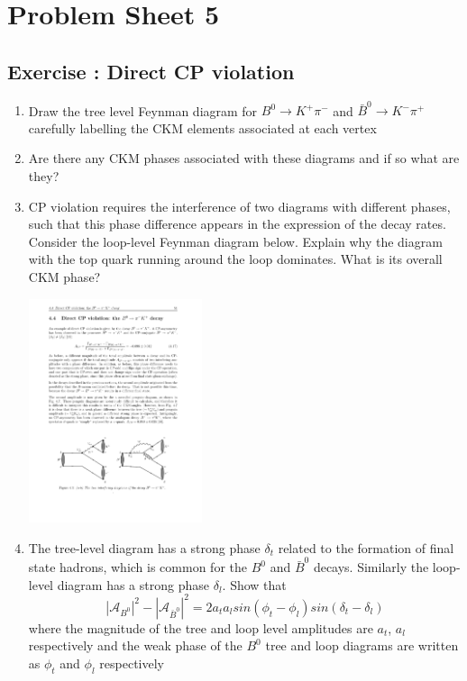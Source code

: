 \section*{Problem Sheet 5}
\label{sec:ps5}
\setcounter{psFiveQuestions}{0}
\renewcommand{\NewQuestion}[1]{\subsection*{Exercise : #1}}

\NewQuestion{Direct CP violation}
\begin{enumerate}
\item Draw the tree level Feynman diagram for $B^0\to K^+\pi^-$
and $\bar{B}^0\to K^-\pi^+$ carefully labelling the CKM elements associated at each vertex
\answerbox{

}
\item Are there any CKM phases associated with these diagrams and if so what are they?
\item CP violation requires the interference of two diagrams with different phases, such that this phase difference appears in the expression of the decay rates. Consider the loop-level Feynman diagram below. Explain why the diagram with the top quark running around the loop dominates. What is its overall CKM phase?
\begin{center}
\includegraphics[width=0.4\textwidth]{problemsheets/fig/b_kpi_penguin.pdf}
\end{center}
\item The tree-level diagram has a strong phase $\delta_t$ related to the formation of final state hadrons, which is common for the $B^0$ and $\bar{B}^0$ decays. Similarly the loop-level diagram has a strong phase $\delta_l$. Show that
\[|\mathcal{A}_{B^0}|^2-|\mathcal{A}_{\bar{B}^0}|^2=2a_{t}a_{l}sin(\phi_t-\phi_l)sin(\delta_t-\delta_l)\]
where the magnitude of the tree and loop level amplitudes are $a_t$, $a_l$ respectively and the weak phase of the $B^0$ tree and loop diagrams are written as $\phi_t$ and $\phi_l$ respectively
\end{enumerate}

